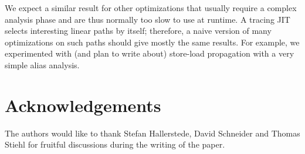 \documentclass[preprint]{sigplanconf}
\begin{document}
We expect a similar result for other optimizations that usually require
a complex analysis phase and are thus normally too slow to use at
runtime.  A tracing JIT selects interesting linear paths by itself;
therefore, a naive version of many optimizations on such paths should
give mostly the same results.  For example, we experimented with (and
plan to write about) store-load propagation with a very simple alias
analysis.


\section*{Acknowledgements}

The authors would like to thank Stefan Hallerstede, David Schneider and Thomas
Stiehl for fruitful discussions during the writing of the paper.



\end{document}
